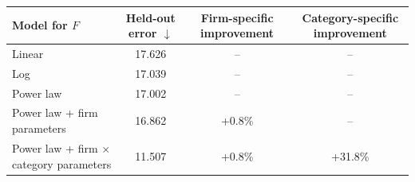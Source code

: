 \begin{tabular}{lccc}
\toprule
Model for $F$ & Held-out error $\downarrow$ & Firm-specific improvement & Category-specific improvement \\
\midrule
Linear & 17.626 & -- & -- \\
Log & 17.039 & -- & -- \\
Power law & 17.002 & -- & -- \\
Power law + firm parameters & 16.862 & +0.8\% & -- \\
Power law + firm $\times$ category parameters & 11.507 & +0.8\% & +31.8\% \\
\bottomrule
\end{tabular}
